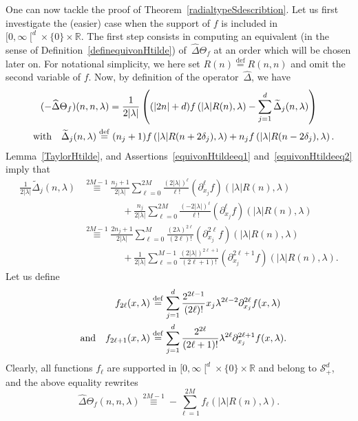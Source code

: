\documentclass[10pt]{amsart}
\theoremstyle{definition}\newtheorem{defi}[theo]{Definition}\newtheorem{rema}[theo]{Remark}\newtheorem{exam}[theo]{Example}\newtheorem{exem}[theo]{Example}\newtheorem{nota}[theo]{Notation}
\newcommand{\lam}{\lambda}
\newcommand{\D}{\Delta}
\newcommand{\wt}{\widetilde}
\newcommand{\wh}{\widehat}
\newcommand*\cS{\mathcal{S}}
\newcommand*\R{\mathbb{R}}
\newcommand{\andf}{\quad\hbox{and}\quad}
\newcommand{\with}{\quad\hbox{with}\quad}
\newcommand*\eqdefa{\overset{\mathrm{def}}{=}}
\newcommand*\equivH[1]{\overset{#1}{\equiv}}
\renewcommand*{\cdotp}{.}
\begin{document}
One can now tackle the proof of Theorem~\ref{radialtypeSdescribtion}. Let us first investigate the (easier) case when the support of $f$ is included in~$[0,\infty\mathclose{[}^d\times\{0\}\times \R$. The first step consists in computing an equivalent (in the sense of Definition~\ref{definequivonHtilde}) of~$\wh\Delta\Theta_f$ at an order which will be chosen later on. For notational simplicity, we here set $R(n)\eqdefa R(n,n)$ and omit the second variable of $f$. Now, by definition of the operator~$\wh \D$, we have
\begin{multline}\label{radialSdescribtiondemoeq0}
(-\wh \Delta \Theta_f)(n,n,\lam) = \frac 1 {2 |\lam|} \left((|2n| +d) f\left (|\lam|R(n),\lam\right) -\sum_{j=1}^d \wt \D_j (n,\lam)\right)\\ \with \wt \D_j (n,\lam) \eqdefa (n_j+1)f \left(|\lam|R(n+2\delta_j),\lam\right) +n_j f \left(|\lam|R(n-2\delta_j),\lam\right).
\end{multline}
Lemma~\ref{TaylorHtilde}, and Assertions~\eqref{equivonHtildeeq1} and~\eqref{equivonHtildeeq2} imply that
\[
\begin{aligned}
\frac 1 {2|\lam|} \wt \D_j (n,\lam) &\equivH {2M-1} \frac {n_j+1} {2|\lam|}
\sum_{\ell=0} ^{2M} \frac {(2|\lam|)^\ell } {\ell!} (\partial_{x_j}^\ell f)(|\lam|R(n),\lam)\\
&\qquad\qquad {}+\frac {n_j} {2|\lam|} \sum_{\ell=0} ^{2M} \frac { (-2|\lam|)^\ell } {\ell!} (\partial_{x_j}^\ell f)(|\lam|R(n),\lam)\\
&\equivH {2M-1} \frac {2n_j+1} {2|\lam|} \sum_{\ell=0} ^{M} \frac {(2\lam)^{2\ell}} {(2\ell)!} (\partial_{x_j}^{2\ell} f)(|\lam|R(n),\lam)\\
&\qquad\qquad {}+\frac {1} {2|\lam|}
\sum_{\ell=0} ^{M-1} \frac {(2|\lam|)^{2\ell+1} } {(2\ell+1)!} (\partial_{x_j}^{2\ell+1} f)(|\lam|R(n),\lam).
\end{aligned}
\]
Let us define
\[
\begin{aligned}
f_{2\ell} (x,\lam) &\eqdefa \sum_{j=1}^d \frac {2^{2\ell-1}} {(2\ell)!} x_j\lam^{2\ell-2} \partial_{x_j}^{2\ell} f(x, \lam)\\ \andf
f_{2\ell+1} (x,\lam) &\eqdefa \sum_{j=1}^d \frac {2^{2\ell}} {(2\ell+1)!} \lam^{2\ell} \partial^{2\ell+1}_{x_j} f(x, \lam).
\end{aligned}
\]
Clearly, all functions $f_\ell$ are supported in $[0,\infty\mathclose{[}^d\times\{0\}\times\R$ and belong to $\cS^d_+$, and the above equality rewrites
\begin{equation}\label{radialSdescribtiondemoeq2}
\wh \Delta \Theta_f (n,n,\lam) \equivH {2M-1} - \sum_{\ell=1}^{2M} f_\ell \left(|\lam|R(n),\lam\right)\cdotp
\end{equation}
\end{document}
